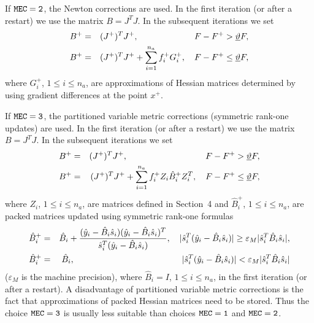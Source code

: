 \documentclass{esub2acm}
\newcommand{\beq}{\begin{eqnarray*}}
\newcommand{\eeq}{\end{eqnarray*}}
\begin{document}

\vspace{3mm}

\noindent If ${\tt MEC=2}$, the Newton corrections are used.
In the first iteration (or after a restart) we use the matrix $B = J^T J$.
In the subsequent iterations we set
%
\beq
B^+ & = & (J^+)^T J^+,  \hspace{23mm} F - F^+ > \underline{\vartheta} F,  \nonumber \\
B^+ & = & (J^+)^T J^+ + \sum_{i=1}^{n_a} f_i^+ G_i^+, \quad
F - F^+ \leq \underline{\vartheta} F, \label{5.2}
\eeq
%
where $G_i^+$, $1 \leq i \leq n_a$, are approximations of Hessian matrices
determined by using gradient differences at the point $x^+$.

\vspace{5mm}


\vspace{3mm}

\noindent If ${\tt MEC=3}$, the partitioned variable metric corrections (symmetric
rank-one updates) are used.
In the first iteration (or after a restart) we use the matrix $B = J^T J$. In the
subsequent iterations we set
%
%
\beq
B^+ & = & (J^+)^T J^+,  \hspace{32mm} F - F^+ > \underline{\vartheta} F, \nonumber \\
B^+ & = & (J^+)^T J^+ + \sum_{i=1}^{n_a} f_i^+ Z_i \hat{B}_i^+ Z_i^T, \quad
F - F^+ \leq \underline{\vartheta} F, \label{5.4}
\eeq
%
where $Z_i$, $1 \leq i \leq n_a$, are matrices defined in Section~4 and
$\hat{B}_i^+$, $1 \leq i \leq n_a$, are packed matrices updated using
symmetric rank-one formulas
%
\beq
\hat{B}_i^+ & = & \hat{B}_i + \frac{(\hat{y}_i - \hat{B}_i \hat{s}_i)
(\hat{y}_i - \hat{B}_i \hat{s}_i)^T}{\hat{s}_i^T (\hat{y}_i - \hat{B}_i \hat{s}_i)},
\quad |\hat{s}_i^T (\hat{y}_i - \hat{B}_i \hat{s}_i)| \geq
\varepsilon_M |\hat{s}_i^T \hat{B}_i \hat{s}_i|, \label{5.5} \\
\hat{B}_i^+ & = & \hat{B}_i, \hspace{44mm} |\hat{s}_i^T (\hat{y}_i - \hat{B}_i \hat{s}_i)|
<  \varepsilon_M |\hat{s}_i^T \hat{B}_i \hat{s}_i| \nonumber
\eeq
%
($\varepsilon_M$ is the machine precision), where $\hat{B}_i = I$,
$1 \leq i \leq n_a$, in the first iteration (or after a restart).
A disadvantage of partitioned variable metric corrections is the
fact that approximations of packed Hessian matrices need to be
stored. Thus the choice ${\tt MEC=3}$ is usually less suitable than
choices ${\tt MEC=1}$ and ${\tt MEC=2}$.
\end{document}
